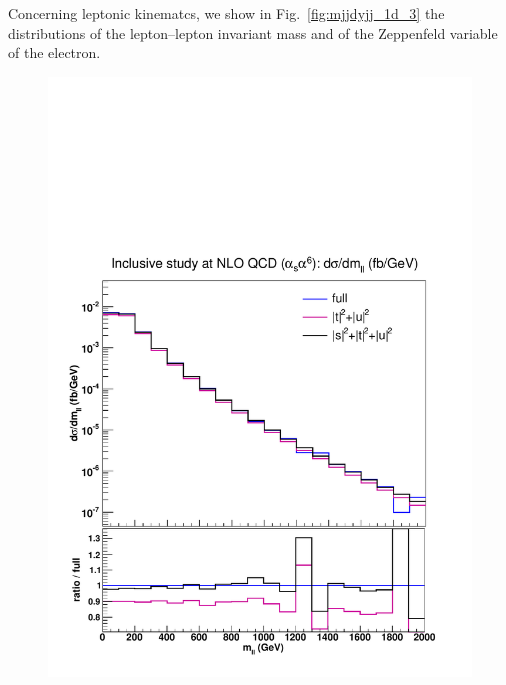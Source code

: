 Concerning leptonic kinematcs, we show in Fig.~\ref{fig:mjjdyjj_1d_3} the distributions of the lepton--lepton invariant mass and of the Zeppenfeld variable of the electron.
\begin{figure}[hbt]
\centering
{\includegraphics[scale=0.35]{figures/scanfigures/mll_nlo.pdf}}

\end{figure}
